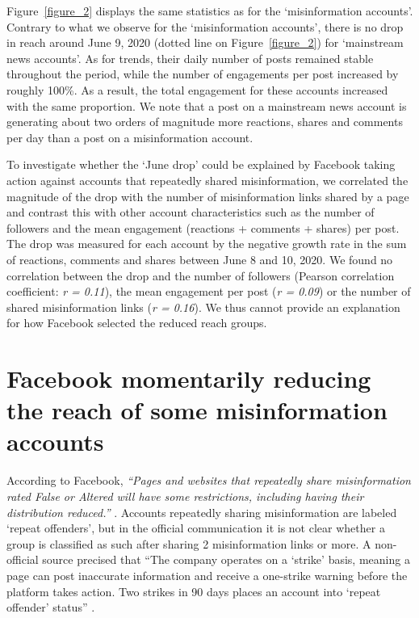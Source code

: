 \documentclass[sigconf]{acmart}
\begin{document}
Figure~\ref{figure_2} displays the same statistics as for the `misinformation accounts'. Contrary to what we observe for the `misinformation accounts', there is no drop in reach around June 9, 2020 (dotted line on Figure~\ref{figure_2}) for `mainstream news accounts'. As for trends, their daily number of posts remained stable throughout the period, while the number of  engagements per post increased by roughly 100\%. As a result, the total engagement for these accounts increased with the same proportion. We note that a post on a mainstream news account is generating about two orders of magnitude more reactions, shares and comments per day than a post on a misinformation account.

To investigate whether the `June drop' could be explained by Facebook taking action against accounts that repeatedly shared misinformation, we correlated the magnitude of the drop with the number of misinformation links shared by a page and contrast this with other account characteristics such as the number of followers and the mean engagement (reactions + comments + shares) per post. The drop was measured for each account by the negative growth rate in the sum of reactions, comments and shares between June 8 and 10, 2020. We found no correlation between the drop and the number of followers (Pearson correlation coefficient: \textit{r = 0.11}), the mean engagement per post (\textit{r = 0.09}) or the number of shared misinformation links (\textit{r = 0.16}). We thus cannot provide an explanation for how  Facebook selected the reduced reach groups.

\section{Facebook momentarily reducing the reach of some misinformation accounts}

According to Facebook, \textit{``Pages and websites that repeatedly share misinformation rated False or Altered will have some restrictions, including having their distribution reduced.''} \cite{FacebookMeasuresAgainstMisinformation}. Accounts repeatedly sharing misinformation are labeled `repeat offenders', but in the official communication it is not clear whether a group is classified as such after sharing 2 misinformation links or more. A non-official source precised that ``The company operates on a `strike' basis, meaning a page can post inaccurate information and receive a one-strike warning before the platform takes action. Two strikes in 90 days places an account into `repeat offender' status'' \cite{NBCnewsMeasuresAgainstMisinformation}.
\end{document}
